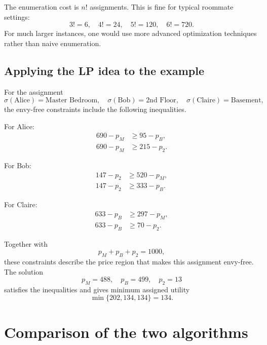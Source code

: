 \documentclass[11pt]{article}
\begin{document}
The enumeration cost is $n!$ assignments. This is fine for typical roommate settings:
\[
3!=6,\quad 4!=24,\quad 5!=120,\quad 6!=720.
\]
For much larger instances, one would use more advanced optimization techniques rather than naive enumeration.

\subsection{Applying the LP idea to the example}

For the assignment
\[
    \sigma(\text{Alice})=\text{Master Bedroom},\quad
    \sigma(\text{Bob})=\text{2nd Floor},\quad
    \sigma(\text{Claire})=\text{Basement},
\]
the envy-free constraints include the following inequalities.

For Alice:
\begin{align*}
690-p_M &\geq 95-p_B,\\
690-p_M &\geq 215-p_2.
\end{align*}

For Bob:
\begin{align*}
147-p_2 &\geq 520-p_M,\\
147-p_2 &\geq 333-p_B.
\end{align*}

For Claire:
\begin{align*}
633-p_B &\geq 297-p_M,\\
633-p_B &\geq 70-p_2.
\end{align*}

Together with
\[
    p_M+p_B+p_2=1000,
\]
these constraints describe the price region that makes this assignment envy-free. The solution
\[
    p_M=488,
    \quad p_B=499,
    \quad p_2=13
\]
satisfies the inequalities and gives minimum assigned utility
\[
    \min\{202,134,134\}=134.
\]

\section{Comparison of the two algorithms}
\end{document}
